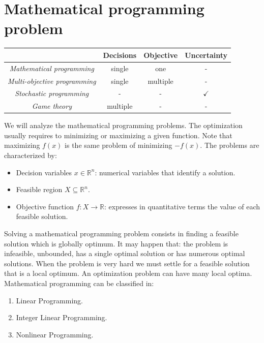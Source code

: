 \documentclass[12pt, a4paper]{report}
\newtheorem[style=M,bodystyle=\normalfont]{proposition}{Proposition}
\newtheorem[style=M,bodystyle=\normalfont]{theorem}{Theorem}
\newtheorem[style=M,bodystyle=\normalfont]{corollary}{Corollary}
\newtheorem[style=M,bodystyle=\normalfont]{lemma}{Lemma}
\newtheorem[style=M,bodystyle=\normalfont]{definition}{Definition}
\begin{document}
    \section{Mathematical programming problem}
    \begin{table}[H]
        \centering
        \begin{tabular}{c|ccc|}
        \cline{2-4}
                                                                   & \textbf{Decisions} & \textbf{Objective} & \textbf{Uncertainty} \\ \hline
        \multicolumn{1}{|c|}{\textit{Mathematical programming}}    & single                   & one                          & -                    \\
        \multicolumn{1}{|c|}{\textit{Multi-objective programming}} & single                   & multiple                     & -                    \\
        \multicolumn{1}{|c|}{\textit{Stochastic programming}}      & -                        & -                            & $\checkmark$         \\
        \multicolumn{1}{|c|}{\textit{Game theory}}                 & multiple                 & -                            & -                    \\ \hline
        \end{tabular}
    \end{table}
    We will analyze the mathematical programming problems. 
    The optimization usually requires to minimizing or maximizing a given function. 
    Note that maximizing $f(x)$ is the same problem of minimizing $-f(x)$. The problems are characterized by: 
    \begin{itemize}
        \item Decision variables $x \in \mathbb{R}^n$: numerical variables that identify a solution. 
        \item Feasible region $X \subseteq \mathbb{R}^n$.
        \item Objective function $f:X \rightarrow\mathbb{R}$: expresses in quantitative terms the value of each feasible solution. 
    \end{itemize}
    Solving a mathematical programming problem consists in finding a feasible solution which is globally optimum. It may happen that: the problem is infeasible, unbounded, has a single 
    optimal solution or has numerous optimal solutions. 
    When the problem is very hard we must settle for a feasible solution that is a local optimum. An optimization problem can have many local optima. 
    Mathematical programming can be classified in:
    \begin{enumerate}
        \item Linear Programming.
        \item Integer Linear Programming.
        \item Nonlinear Programming. 
    \end{enumerate}
    
\end{document}
